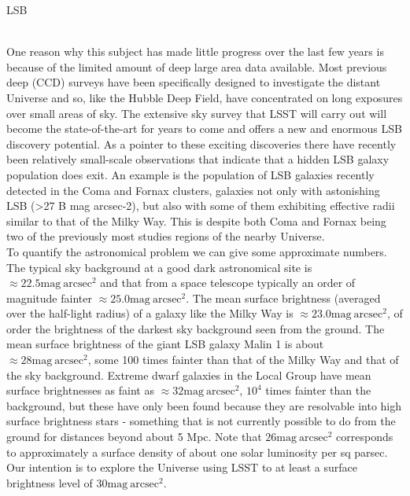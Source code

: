 \begin{tasklist}{LSB}
\begin{task}
{\\
One reason why this subject has made little progress over the last few years is because of the limited amount of deep large area data available. Most previous deep (CCD) surveys have been specifically designed to investigate the distant Universe and so, like the Hubble Deep Field, have concentrated on long exposures over small areas of sky. The extensive sky survey that LSST will carry out will become the state-of-the-art for years to come and offers a new and enormous LSB discovery potential. As a pointer to these exciting discoveries there have recently been relatively small-scale observations that indicate that a hidden LSB galaxy population does exit. An example is the population of LSB galaxies recently detected in the Coma and Fornax clusters, galaxies not only with astonishing LSB (>27 B mag arcsec-2), but also with some of them exhibiting effective radii similar to that of the Milky Way. This is despite both Coma and Fornax being two of the previously most studies regions of the nearby Universe.
\\
To quantify the astronomical problem we can give some approximate numbers. The typical sky background at a good dark astronomical site is $\approx22.5\mathrm{mag}~\mathrm{arcsec}^2$ and that from a space telescope typically an order of magnitude fainter $\approx25.0\mathrm{mag}~\mathrm{arcsec}^2$. The mean surface brightness (averaged over the half-light radius) of a galaxy like the Milky Way is $\approx23.0\mathrm{mag}~\mathrm{arcsec}^2$, of order the brightness of the darkest sky background seen from the ground. The mean surface brightness of the giant LSB galaxy Malin 1 is about $\approx28\mathrm{mag}~\mathrm{arcsec}^2$, some 100 times fainter than that of the Milky Way and that of the sky background. Extreme dwarf galaxies in the Local Group have mean surface brightnesses as faint as $\approx32\mathrm{mag}~\mathrm{arcsec}^2$, $10^4$ times fainter than the background, but these have only been found because they are resolvable into high surface brightness stars - something that is not currently possible to do from the ground for distances beyond about 5 Mpc. Note that $26\mathrm{mag}~\mathrm{arcsec}^2$ corresponds to approximately a surface density of about one solar luminosity per sq parsec. Our intention is to explore the Universe using LSST to at least a surface brightness level of $30\mathrm{mag}~\mathrm{arcsec}^2$.
}
\end{task}
\end{tasklist}
